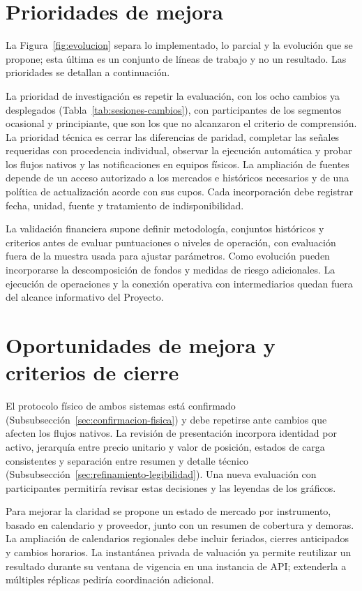 \section{Prioridades de mejora}\label{sec:posibles-mejoras}

La Figura~\ref{fig:evolucion} separa lo implementado, lo parcial y la evolución que se propone; esta última es un conjunto de líneas de trabajo y no un resultado. Las prioridades se detallan a continuación.


La prioridad de investigación es repetir la evaluación, con los ocho cambios ya desplegados (Tabla~\ref{tab:sesiones-cambios}), con participantes de los segmentos ocasional y principiante, que son los que no alcanzaron el criterio de comprensión. La prioridad técnica es cerrar las diferencias de paridad, completar las señales requeridas con procedencia individual, observar la ejecución automática y probar los flujos nativos y las notificaciones en equipos físicos. La ampliación de fuentes depende de un acceso autorizado a los mercados e históricos necesarios y de una política de actualización acorde con sus cupos. Cada incorporación debe registrar fecha, unidad, fuente y tratamiento de indisponibilidad.

La validación financiera supone definir metodología, conjuntos históricos y criterios antes de evaluar puntuaciones o niveles de operación, con evaluación fuera de la muestra usada para ajustar parámetros. Como evolución pueden incorporarse la descomposición de fondos y medidas de riesgo adicionales. La ejecución de operaciones y la conexión operativa con intermediarios quedan fuera del alcance informativo del Proyecto.


\section{Oportunidades de mejora y criterios de cierre}\label{sec:oportunidades-mejora}

El protocolo físico de ambos sistemas está confirmado (Subsubsección~\ref{sec:confirmacion-fisica}) y debe repetirse ante cambios que afecten los flujos nativos. La revisión de presentación incorpora identidad por activo, jerarquía entre precio unitario y valor de posición, estados de carga consistentes y separación entre resumen y detalle técnico (Subsubsección~\ref{sec:refinamiento-legibilidad}). Una nueva evaluación con participantes permitiría revisar estas decisiones y las leyendas de los gráficos.

Para mejorar la claridad se propone un estado de mercado por instrumento, basado en calendario y proveedor, junto con un resumen de cobertura y demoras. La ampliación de calendarios regionales debe incluir feriados, cierres anticipados y cambios horarios. La instantánea privada de valuación ya permite reutilizar un resultado durante su ventana de vigencia en una instancia de API; extenderla a múltiples réplicas pediría coordinación adicional.

